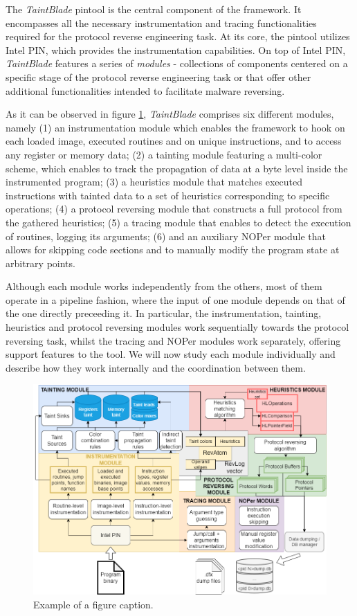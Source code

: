 \documentclass[conference]{IEEEtran}
\begin{document}
The \textit{TaintBlade} pintool is the central component of the framework. It
encompasses all the necessary instrumentation and tracing functionalities
required for the protocol reverse engineering task. At its core, the pintool
utilizes Intel PIN, which provides the instrumentation capabilities. On top of
Intel PIN, \textit{TaintBlade} features a series of \textit{modules} -
collections of components centered on a specific stage of the protocol reverse
engineering task or that offer other additional functionalities intended to
facilitate malware reversing.

As it can be observed in figure \ref{fig_3_archdetailedsteps},
\textit{TaintBlade} comprises six different modules, namely (1) an
instrumentation module which enables the framework to hook on each loaded
image, executed routines and on unique instructions, and to access any register
or memory data; (2) a tainting module featuring a multi-color scheme, which
enables to track the propagation of data at a byte level inside the
instrumented program; (3) a heuristics module that matches executed
instructions with tainted data to a set of heuristics corresponding to specific
operations; (4) a protocol reversing module that constructs a full protocol
from the gathered heuristics; (5) a tracing module that enables to detect the
execution of routines, logging its arguments; (6) and an auxiliary NOPer module
that allows for skipping code sections and to manually modify the program state
at arbitrary points.

Although each module works independently from the others, most of them operate
in a pipeline fashion, where the input of one module depends on that of the one
directly preceeding it. In particular, the instrumentation, tainting,
heuristics and protocol reversing modules work sequentially towards the
protocol reversing task, whilst the tracing and NOPer modules work separately,
offering support features to the tool. We will now study each module
individually and describe how they work internally and the coordination between
them.

\begin{figure}
    \centerline{\includegraphics[width=\textwidth]{images/archdetailedsteps.drawio.png}}
    \caption{Example of a figure caption.}
    \label{fig_3_archdetailedsteps}
\end{figure}
\end{document}
